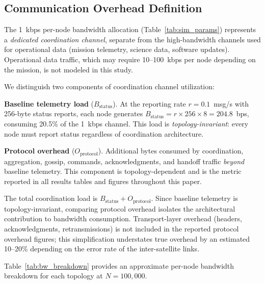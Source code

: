 \documentclass[journal]{IEEEtran}
\begin{document}
\subsection{Communication Overhead Definition}

The 1~kbps per-node bandwidth allocation (Table~\ref{tab:sim_params}) represents a \emph{dedicated coordination channel}, separate from the high-bandwidth channels used for operational data (mission telemetry, science data, software updates). Operational data traffic, which may require 10--100~kbps per node depending on the mission, is not modeled in this study.

We distinguish two components of coordination channel utilization:

\textbf{Baseline telemetry load} ($B_{\text{status}}$). At the reporting rate $r = 0.1$~msg/s with 256-byte status reports, each node generates $B_{\text{status}} = r \times 256 \times 8 = 204.8$~bps, consuming 20.5\% of the 1~kbps channel. This load is \emph{topology-invariant}: every node must report status regardless of coordination architecture.

\textbf{Protocol overhead} ($O_{\text{protocol}}$). Additional bytes consumed by coordination, aggregation, gossip, commands, acknowledgments, and handoff traffic \emph{beyond} baseline telemetry. This component is topology-dependent and is the metric reported in all results tables and figures throughout this paper.

The total coordination load is $B_{\text{status}} + O_{\text{protocol}}$. Since baseline telemetry is topology-invariant, comparing protocol overhead isolates the architectural contribution to bandwidth consumption. Transport-layer overhead (headers, acknowledgments, retransmissions) is not included in the reported protocol overhead figures; this simplification understates true overhead by an estimated 10--20\% depending on the error rate of the inter-satellite links.

Table~\ref{tab:bw_breakdown} provides an approximate per-node bandwidth breakdown for each topology at $N = 100{,}000$.
\end{document}
